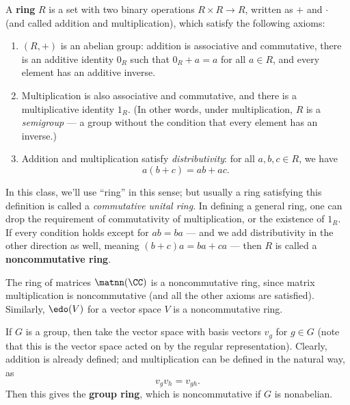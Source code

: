 \begin{definition}
A \textbf{ring} $R$ is a set with two binary operations $R \times R \to R$, written as $+$ and $\cdot$ (and called addition and multiplication), which satisfy the following axioms: 
    \begin{enumerate}
        \item $(R, +)$ is an abelian group: addition is associative and commutative, there is an additive identity $0_R$ such that $0_R + a = a$ for all $a \in R$, and every element has an additive inverse. 
        \item Multiplication is also associative and commutative, and there is a multiplicative identity $1_R$. (In other words, under multiplication, $R$ is a \emph{semigroup} --- a group without the condition that every element has an inverse.)
        \item Addition and multiplication satisfy \emph{distributivity}: for all $a, b, c \in R$, we have \[a(b + c) = ab + ac.\] 
    \end{enumerate}
\end{definition}
    

In this class, we'll use ``ring'' in this sense; but usually a ring satisfying this definition is called a \emph{commutative unital ring}. In defining a general ring, one can drop the requirement of commutativity of multiplication, or the existence of $1_R$. If every condition holds except for $ab = ba$ --- and we add distributivity in the other direction as well, meaning $(b + c)a = ba + ca$ --- then $R$ is called a \textbf{noncommutative ring}. 


\begin{example}[Matrices]
The ring of matrices $\matnn(\CC)$ is a noncommutative ring, since matrix multiplication is noncommutative (and all the other axioms are satisfied). Similarly, $\edo(V)$ for a vector space $V$ is a noncommutative ring.
\end{example}

\begin{example}
If $G$ is a group, then take the vector space with basis vectors $v_g$ for $g \in G$ (note that this is the vector space acted on by the regular representation). Clearly, addition is already defined; and multiplication can be defined in the natural way, as \[v_gv_h = v_{gh}.\] Then this gives the \textbf{group ring}, which is noncommutative if $G$ is nonabelian. 
\end{example}

